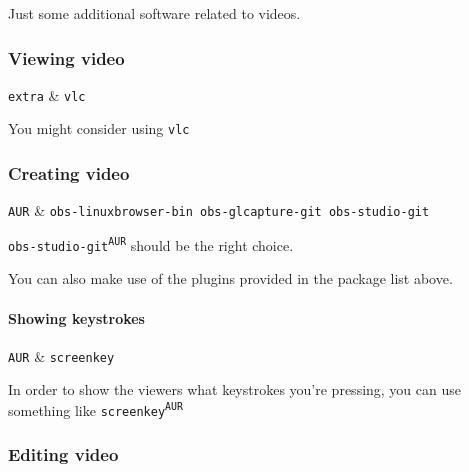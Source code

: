 \documentclass[10pt]{dustdoc}
\begin{document}
Just some additional software related to videos.

\subsubsection{Viewing video}
\label{sec:viewing-video}

\begin{packagetable}
    \texttt{extra} & \texttt{vlc} \\
\end{packagetable}

You might consider using \texttt{vlc}

\subsubsection{Creating video}
\label{sec:creating-video}

\begin{packagetable}
    \texttt{AUR} & \texttt{obs-linuxbrowser-bin obs-glcapture-git obs-studio-git} \\
\end{packagetable}

\texttt{obs-studio-git\textsuperscript{\texttt{AUR}}} should be the right choice.

You can also make use of the plugins provided in the package list above.

\paragraph{Showing keystrokes}
\label{par:showing-keystrokes}

\begin{packagetable}
    \texttt{AUR} & \texttt{screenkey} \\
\end{packagetable}

In order to show the viewers what keystrokes you’re pressing, you can use something like \texttt{screenkey\textsuperscript{\texttt{AUR}}}


\subsubsection{Editing video}
\label{sec:editing-video}
\end{document}
